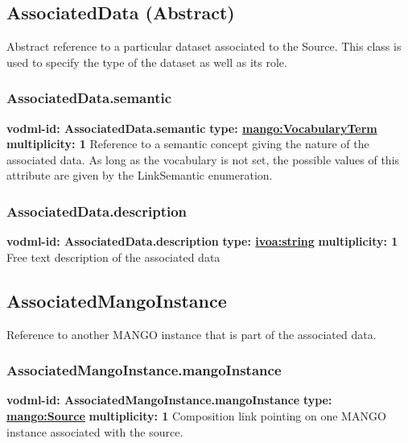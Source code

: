   \subsection{AssociatedData (Abstract)}
  \label{sect:AssociatedData}
    Abstract reference to a particular dataset associated to the Source. This class is used to specify the type of the dataset as well as its role.

    \subsubsection{AssociatedData.semantic}
      \textbf{vodml-id: AssociatedData.semantic} \newline
      \textbf{type: \hyperref[sect:VocabularyTerm]{mango:VocabularyTerm}} \newline
      \textbf{multiplicity: 1} \newline
      Reference to a semantic concept giving the nature of the associated data. As long as the vocabulary is not set, the possible values of this attribute are given by the LinkSemantic enumeration.

    \subsubsection{AssociatedData.description}
      \textbf{vodml-id: AssociatedData.description} \newline
      \textbf{type: \hyperref[sect:ivoa]{ivoa:string}} \newline
      \textbf{multiplicity: 1} \newline
      Free text description of the associated data

  \subsection{AssociatedMangoInstance}
  \label{sect:AssociatedMangoInstance}
    Reference to another MANGO instance that is part of the associated data.

    \subsubsection{AssociatedMangoInstance.mangoInstance}
      \textbf{vodml-id: AssociatedMangoInstance.mangoInstance} \newline
      \textbf{type: \hyperref[sect:Source]{mango:Source}} \newline
      \textbf{multiplicity: 1} \newline
      Composition link pointing on one MANGO instance associated with the source.

